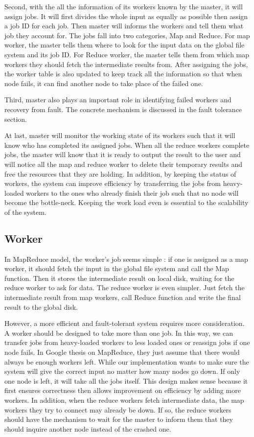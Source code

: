 \documentclass[12pt]{article}
\begin{document}
Second, with the all the information of its workers known by the master, it will assign jobs. It will
first divides the whole input as equally as possible then assign a job ID for each job. Then master will informs the workers and tell them 
what job they account for. The jobs fall into two categories, Map and Reduce. For map worker, the master tells
them where to look for the input data on the global file system and its job ID. For Reduce worker, the master tells
them from which map workers they should fetch the intermediate results from. After assigning the jobs, the worker table
is also updated to keep track all the information so that when node fails, it can find another node to take place of the 
failed one.

Third, master also plays an important role in identifying failed workers and recovery from fault. The concrete mechanism
is discussed in the fault tolerance section.

At last, master will monitor the working state of its workers such that it will know who has completed its assigned jobs. When all 
the reduce workers complete jobs, the master will know that it is ready to output the result to the user and will notice all the map and
reduce worker to delete their temporary results and free the resources that they are holding. In addition, by keeping the status of workers,
the system can improve efficiency by transferring the jobs from heavy-loaded workers to the ones who already finish their job such that no
node will become the bottle-neck. Keeping the work load even is essential to the scalability of the system.   
\subsection{Worker}

In MapReduce model, the worker's job seems simple : if one is assigned as a map worker, it should fetch the input in the global file system and
call the Map function. Then it stores the intermediate result on local disk, waiting for the reduce worker to ask for data. The reduce worker
is even simpler. Just fetch the intermediate result from map workers, call Reduce function and write the final result to the global disk. 

However, a more efficient and fault-tolerant system requires more consideration. A worker should be designed to take more than one job. In this
way, we can transfer jobs from heavy-loaded workers to less loaded ones or reassign jobs if one node fails. In Google thesis on MapReduce, they just assume that there would always be enough workers left. While our implementation wants to make sure the system will give the correct input no matter how many nodes go down. If only one node is left, it will take all the jobs itself. This design makes sense because it first ensures correctness then allows improvement on efficiency by adding more workers.
In addition, when the reduce workers fetch intermediate data, the map workers they try to connect may already be down. If so, the reduce workers
should have the mechanism to wait for the master to inform them that they should inquire another node instead of the crashed one.
\end{document}
